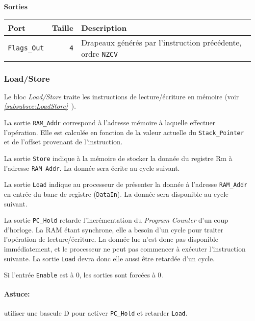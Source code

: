 \vspace{1em}
\textbf{Sorties}\\

\begin{tabular}{|l|r|l|}
\hline 
\textbf{Port} & \textbf{Taille} & \textbf{Description}\\
\hline

\texttt{Flags\_Out}	&  \texttt{4} & Drapeaux générés par l'instruction précédente, ordre \texttt{NZCV}\\

\hline
\end{tabular}



\subsubsection{Load/Store}


Le bloc \textit{Load/Store} traite les instructions de lecture/écriture en mémoire (voir \textit{\ref{subsubsec:LoadStore}~}).

La sortie \texttt{RAM\_Addr} correspond à l'adresse mémoire à laquelle effectuer l'opération.
Elle est calculée en fonction de la valeur actuelle du \texttt{Stack\_Pointer} et de l'offset provenant de l'instruction.

La sortie \texttt{Store} indique à la mémoire de stocker la donnée du registre Rm à l'adresse \texttt{RAM\_Addr}. La donnée sera écrite au cycle suivant.

La sortie \texttt{Load} indique au processeur de présenter la donnée à l'adresse \texttt{RAM\_Addr} en entrée du banc de registre (\texttt{DataIn}). La donnée sera disponible au cycle suivant.

La sortie \texttt{PC\_Hold} retarde l'incrémentation du \textit{Program Counter} d'un coup d'horloge. La RAM étant synchrone, elle a besoin d'un cycle pour traiter l'opération de lecture/écriture. La donnée lue n'est donc pas disponible immédiatement, et le processeur ne peut pas commencer à exécuter l'instruction suivante.
La sortie \texttt{Load} devra donc elle aussi être retardée d'un cycle.

Si l'entrée \texttt{Enable} est à 0, les sorties sont forcées à 0.

\paragraph{Astuce:} utiliser une bascule D pour activer \texttt{PC\_Hold} et retarder \texttt{Load}.

